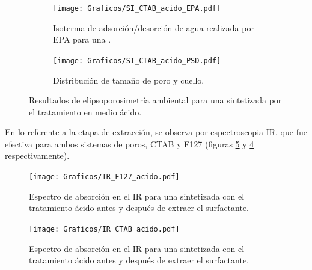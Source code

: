 {		\pagebreak

		\begin{figure}[!ht]
		  	\begin{subfigure}[t]{0.495\textwidth}
		  	\texttt{[image: Graficos/SI\_CTAB\_acido\_EPA.pdf]}
			\caption[Elipsoporsimetría \pdmC\space tratamiento ácido.]{Isoterma de adsorción/desorción de agua realizada por EPA para una \pdmC.}
			\label{fig:CTAB_acido_EPA}
			\end{subfigure}
			\begin{subfigure}[t]{0.495\textwidth}
		  	\texttt{[image: Graficos/SI\_CTAB\_acido\_PSD.pdf]}
			\caption{Distribución de tamaño de poro y cuello.\\ }
			\label{fig:CTAB_acido_PSD}
			\end{subfigure}
			\caption[Elipsoporosimetría \pdmC\space tratamiento ácido.]{Resultados de elipsoporosimetría ambiental para una \pdmC\space sintetizada por el tratamiento en medio ácido.}
			\end{figure}

		En lo referente a la etapa de extracción, se observa por espectroscopia IR, que fue efectiva para ambos sistemas de poros, CTAB y F127 (figuras \ref{fig:IR_CTAB_acido} y \ref{fig:IR_F127_acido} respectivamente).	
			
		\begin{figure}[!ht]
			\begin{center}
			\texttt{[image: Graficos/IR\_F127\_acido.pdf]}
			\caption[FTIR \pdmF\space tratamiento ácido.]{Espectro de absorción en el IR para una \pdmF\space sintetizada con el tratamiento ácido antes y después de extraer el surfactante.}
			\label{fig:IR_F127_acido}
			\end{center}
			\end{figure}
		
		\pagebreak

		 \begin{figure}[!ht]
			\begin{center}
			\texttt{[image: Graficos/IR\_CTAB\_acido.pdf]}
			\caption[FTIR \pdmC\space tratamiento ácido.]{Espectro de absorción en el IR para una \pdmC\space sintetizada con el tratamiento ácido antes y después de extraer el surfactante.}
			\label{fig:IR_CTAB_acido}
			\end{center}
			\end{figure}
 	
}

